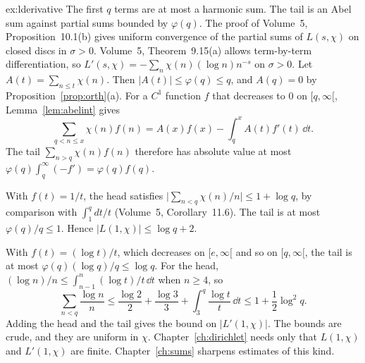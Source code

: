 \begin{solution}{ex:lderivative}
\idea The first $q$ terms are at most a harmonic sum. The tail is an Abel sum against partial sums bounded by $\varphi(q)$.
\writeup The proof of Volume~5, Proposition~10.1(b) gives uniform convergence of the partial sums of $L(s,\chi)$ on closed discs in $\sigma>0$. Volume~5, Theorem~9.15(a) allows term-by-term differentiation, so $L'(s,\chi)=-\sum_n\chi(n)(\log n)n^{-s}$ on $\sigma>0$. Let $A(t)=\sum_{n\le t}\chi(n)$. Then $|A(t)|\le\varphi(q)\le q$, and $A(q)=0$ by Proposition~\ref{prop:orth}(a). For a $C^1$ function $f$ that decreases to $0$ on $[q,\infty[$, Lemma~\ref{lem:abelint} gives
\[
\sum_{q<n\le x}\chi(n)f(n)=A(x)f(x)-\int_q^x A(t)f'(t)\,\dd t.
\]
The tail $\sum_{n>q}\chi(n)f(n)$ therefore has absolute value at most $\varphi(q)\int_q^\infty(-f')=\varphi(q)f(q)$.

With $f(t)=1/t$, the head satisfies $\bigl|\sum_{n<q}\chi(n)/n\bigr|\le1+\log q$, by comparison with $\int_1^q dt/t$ (Volume~5, Corollary~11.6). The tail is at most $\varphi(q)/q\le1$. Hence $|L(1,\chi)|\le\log q+2$.

With $f(t)=(\log t)/t$, which decreases on $[e,\infty[$ and so on $[q,\infty[$, the tail is at most $\varphi(q)(\log q)/q\le\log q$. For the head, $(\log n)/n\le\int_{n-1}^n(\log t)/t\,\dd t$ when $n\ge4$, so
\[
\sum_{n<q}\frac{\log n}n\le\frac{\log2}2+\frac{\log3}3+\int_3^q\frac{\log t}t\,\dd t\le1+\frac12\log^2 q.
\]
Adding the head and the tail gives the bound on $|L'(1,\chi)|$. The bounds are crude, and they are uniform in $\chi$. Chapter~\ref{ch:dirichlet} needs only that $L(1,\chi)$ and $L'(1,\chi)$ are finite. Chapter~\ref{ch:sums} sharpens estimates of this kind.
\end{solution}

